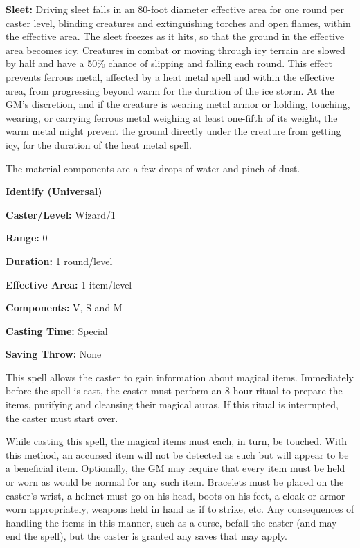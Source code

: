 \begin{multicols}{2}
\textbf{Sleet:} Driving sleet falls in an 80-foot diameter effective area for one round per caster level, blinding creatures and extinguishing torches and open flames, within the effective area.  The sleet freezes as it hits, so that the ground in the effective area becomes icy.  Creatures in combat or moving through icy terrain are slowed by half and have a 50\% chance of slipping and falling each round.  This effect prevents ferrous metal, affected by a heat metal spell and within the effective area, from progressing beyond warm for the duration of the ice storm.  At the GM's discretion, and if the creature is wearing metal armor or holding, touching, wearing, or carrying ferrous metal weighing at least one-fifth of its weight, the warm metal might prevent the ground directly under the creature from getting icy, for the duration of the heat metal spell.

The material components are a few drops of water and pinch of dust.

\vspace{1em}

\noindent
\begin{minipage}{\columnwidth}

\noindent \textbf{Identify (Universal)}

\noindent \textbf{Caster/Level:} Wizard/1

\noindent \textbf{Range:} 0

\noindent \textbf{Duration:} 1 round/level

\noindent \textbf{Effective Area:} 1 item/level

\noindent \textbf{Components:} V, S and M

\noindent \textbf{Casting Time:} Special

\noindent \textbf{Saving Throw:} None

\end{minipage}

This spell allows the caster to gain information about magical items.  Immediately before the spell is cast, the caster must perform an 8-hour ritual to prepare the items, purifying and cleansing their magical auras.  If this ritual is interrupted, the caster must start over.  

While casting this spell, the magical items must each, in turn, be touched.  With this method, an accursed item will not be detected as such but will appear to be a beneficial item.  Optionally, the GM may require that every item must be held or worn as would be normal for any such item.  Bracelets must be placed on the caster's wrist, a helmet must go on his head, boots on his feet, a cloak or armor worn appropriately, weapons held in hand as if to strike, etc.  Any consequences of handling the items in this manner, such as a curse, befall the caster (and may end the spell), but the caster is granted any saves that may apply.


\end{multicols}
